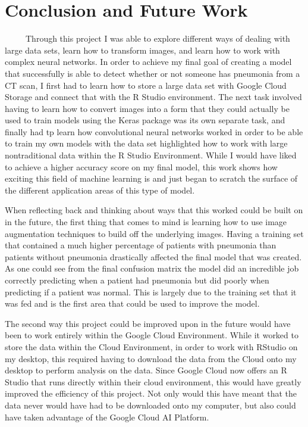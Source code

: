 \documentclass[12pt]{article}
\begin{document}
\hypertarget{conclusion-and-future-work}{%
\section{Conclusion and Future Work}\label{conclusion-and-future-work}}

~~~~~Through this project I was able to explore different ways of
dealing with large data sets, learn how to transform images, and learn
how to work with complex neural networks. In order to achieve my final
goal of creating a model that successfully is able to detect whether or
not someone has pneumonia from a CT scan, I first had to learn how to
store a large data set with Google Cloud Storage and connect that with
the R Studio environment. The next task involved having to learn how to
convert images into a form that they could actually be used to train
models using the Keras package was its own separate task, and finally
had tp learn how convolutional neural networks worked in order to be
able to train my own models with the data set highlighted how to work
with large nontraditional data within the R Studio Environment. While I
would have liked to achieve a higher accuracy score on my final model,
this work shows how exciting this field of machine learning is and just
began to scratch the surface of the different application areas of this
type of model.

When reflecting back and thinking about ways that this worked could be
built on in the future, the first thing that comes to mind is learning
how to use image augmentation techniques to build off the underlying
images. Having a training set that contained a much higher percentage of
patients with pneumonia than patients without pneumonia drastically
affected the final model that was created. As one could see from the
final confusion matrix the model did an incredible job correctly
predicting when a patient had pneumonia but did poorly when predicting
if a patient was normal. This is largely due to the training set that it
was fed and is the first area that could be used to improve the model.

The second way this project could be improved upon in the future would
have been to work entirely within the Google Cloud Environment. While it
worked to store the data within the Cloud Environment, in order to work
with RStudio on my desktop, this required having to download the data
from the Cloud onto my desktop to perform analysis on the data. Since
Google Cloud now offers an R Studio that runs directly within their
cloud environment, this would have greatly improved the efficiency of
this project. Not only would this have meant that the data never would
have had to be downloaded onto my computer, but also could have taken
advantage of the Google Cloud AI Platform.
\end{document}
